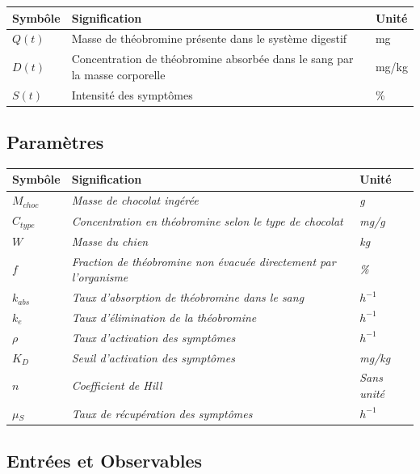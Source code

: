 \documentclass[11pt,a4paper]{article}
\begin{document}
\begin{center}
\begin{tabular}{p{2.5cm}p{8cm}p{3cm}}
\toprule
\textbf{Symbôle} & \textbf{Signification} & \textbf{Unité} \\
\midrule
\(Q(t)\) & {Masse de théobromine présente dans le système digestif} & {mg} \\
\(D(t)\) & {Concentration de théobromine absorbée dans le sang par la masse corporelle} & {mg/kg} \\
\(S(t)\) & {Intensité des symptômes} & {\%} \\
\bottomrule
\end{tabular}
\end{center}

\subsection{Paramètres}

\begin{center}
\begin{tabularx}{\textwidth}{p{2.3cm}X p{2.5cm}}
\toprule
\textbf{Symbôle} & \textbf{Signification} & \textbf{Unité} \\
\midrule
\(M{_{choc}}\) & \emph{Masse de chocolat ingérée} & \emph{g} \\
\(C{_{type}}\) & \emph{Concentration en théobromine selon le type de chocolat} & \emph{mg/g} \\
\(W\) & \emph{Masse du chien} & \emph{kg} \\
\(f\) & \emph{Fraction de théobromine non évacuée directement par l'organisme} & \emph{\%} \\
\(k{_{abs}}\) & \emph{Taux d'absorption de théobromine dans le sang} & \emph{$h^{-1}$} \\
\(k{_{e}}\) & \emph{Taux d'élimination de la théobromine} & \emph{$h^{-1}$} \\
\(\rho\) & \emph{Taux d'activation des symptômes} & \emph{$h^{-1}$} \\
\(K{_{D}}\) & \emph{Seuil d'activation des symptômes } & \emph{mg/kg} \\
\(n\) & \emph{Coefficient de Hill} & \emph{Sans unité} \\
\(\mu{_S}\) & \emph{Taux de récupération des symptômes} & \emph{$h^{-1}$} \\

\bottomrule
\end{tabularx}
\end{center}

\subsection{Entrées et Observables}
\end{document}

